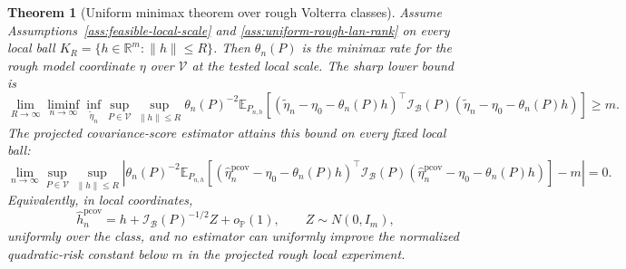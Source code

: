\documentclass[11pt,a4paper]{amsart}
\theoremstyle{plain}
\newtheorem{theorem}{Theorem}[section]
\theoremstyle{definition}
\theoremstyle{remark}
\newcommand{\R}{\mathbb{R}}
\newcommand{\PP}{\mathbb{P}}
\newcommand{\EE}{\mathbb{E}}
\newcommand{\scrB}{\mathcal{B}}
\newcommand{\scrI}{\mathcal{I}}
\begin{document}
\begin{theorem}[Uniform minimax theorem over rough Volterra classes]\label{thm:modular-minimax}
Assume Assumptions~\ref{ass:feasible-local-scale} and \ref{ass:uniform-rough-lan-rank} on every local ball
\(K_R=\{h\in\R^m:\|h\|\le R\}\).  Then \(\theta_n(P)\) is the minimax rate for the rough model
coordinate \(\eta\) over \(\mathcal V\) at the tested local scale.  The sharp lower bound is
\[
        \lim_{R\to\infty}
        \liminf_{n\to\infty}
        \inf_{\widetilde\eta_n}
        \sup_{P\in\mathcal V}
        \sup_{\|h\|\le R}
        \theta_n(P)^{-2}
        \EE_{P_{n,h}}
        \left[
        (\widetilde\eta_n-\eta_0-\theta_n(P) h)^\top
        \scrI_{\scrB}(P)
        (\widetilde\eta_n-\eta_0-\theta_n(P) h)
        \right]
        \ge m.
\]
The projected covariance-score estimator attains this bound on every fixed local ball:
\[
        \lim_{n\to\infty}
        \sup_{P\in\mathcal V}
        \sup_{\|h\|\le R}
        \left|
        \theta_n(P)^{-2}
        \EE_{P_{n,h}}
        \left[
        (\widehat\eta_n^{\mathrm{pcov}}-\eta_0-\theta_n(P) h)^\top
        \scrI_{\scrB}(P)
        (\widehat\eta_n^{\mathrm{pcov}}-\eta_0-\theta_n(P) h)
        \right]
        -
        m
        \right|
        =
        0.
\]
Equivalently, in local coordinates,
\[
        \widehat h_n^{\mathrm{pcov}}
        =
        h+\scrI_{\scrB}(P)^{-1/2}Z+o_{\PP}(1),
        \qquad
        Z\sim N(0,I_m),
\]
uniformly over the class, and no estimator can uniformly improve the normalized quadratic-risk
constant below \(m\) in the projected rough local experiment.
\end{theorem}
\end{document}
